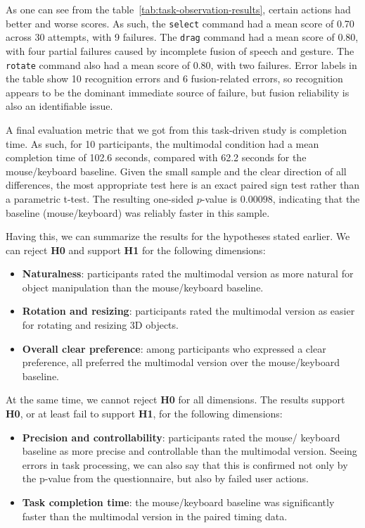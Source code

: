 \documentclass[sigconf]{acmart}
\begin{document}
As one can see from the table~\ref{tab:task-observation-results}, certain actions had better and worse scores. As such,
the \texttt{select} command had a mean score of 0.70 across 30 attempts, with 9 failures. The
\texttt{drag} command had a mean score of 0.80, with four partial failures
caused by incomplete fusion of speech and gesture. The \texttt{rotate} command
also had a mean score of 0.80, with two failures. Error labels in the table
show 10 recognition errors and 6 fusion-related errors, so recognition appears
to be the dominant immediate source of failure, but fusion reliability is also
an identifiable issue.

A final evaluation metric that we got from this task-driven study is completion
time. As such, for 10 participants, the multimodal condition had a mean completion time
of 102.6 seconds, compared with 62.2 seconds for the mouse/keyboard baseline.
Given the small sample and the clear direction of all differences, the most
appropriate test here is an exact paired sign test rather than a parametric
t-test. The resulting one-sided \(p\)-value is \(0.00098\), indicating that
the baseline (mouse/keyboard) was reliably faster in this sample.

Having this, we can summarize the results for the hypotheses stated earlier.
We can reject \textbf{H0} and support \textbf{H1} for the following dimensions:

\begin{itemize}
  \item \textbf{Naturalness}: participants rated the multimodal version as more
  natural for object manipulation than the mouse/keyboard baseline.
  \item \textbf{Rotation and resizing}: participants rated the multimodal
  version as easier for rotating and resizing 3D objects.
  \item \textbf{Overall clear preference}: among participants who expressed a
  clear preference, all preferred the multimodal version over the
  mouse/keyboard baseline.
\end{itemize}

\newpage
At the same time, we cannot reject \textbf{H0} for all dimensions. The results
support \textbf{H0}, or at least fail to support \textbf{H1}, for the following
dimensions:

\begin{itemize}
  \item \textbf{Precision and controllability}: participants rated the
  mouse/ keyboard baseline as more precise and controllable than the multimodal
  version. Seeing errors in task processing, we can also say that this is confirmed
  not only by the p-value from the questionnaire, but also by failed user actions.
  \item \textbf{Task completion time}: the mouse/keyboard baseline was
  significantly faster than the multimodal version in the paired timing data.
\end{itemize}
\end{document}
